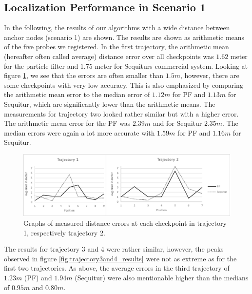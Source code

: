 \subsection{Localization Performance in Scenario 1}
In the following, the results of our algorithms with a wide distance between anchor nodes (scenario 1) are shown. The results are shown as arithmetic means of the five probes we registered. In the first trajectory, the arithmetic mean (hereafter often called average) distance error over all checkpoints was $1.62$ meter for the particle filter and $1.75$ meter for Sequiturs commercial system. Looking at figure \ref{fig:trajectory1and2_results}, we see that the errors are often smaller than $1.5m$, however, there are some checkpoints with very low accuracy. This is also emphasized by comparing the arithmetic mean error to the median error of $1.12m$ for PF and $1.13m$ for Sequitur, which are significantly lower than the arithmetic means. The measurements for trajectory two looked rather similar but with a higher error. The arithmetic mean error for the PF was $2.39m$ and for Sequitur $2.35m$. The median errors were again a lot more accurate with $1.59m$ for PF and $1.16m$ for Sequitur.
\begin{figure}[th]
\centering
\includegraphics[width=1.0\textwidth]{Figures/trajectory1_2_results}
\decoRule
\caption[Localization Results of Trajectory 1 and 2]{Graphs of measured distance errors at each checkpoint in trajectory 1, respectively trajectory 2.}
\label{fig:trajectory1and2_results}
\end{figure}
The results for trajectory 3 and 4 were rather similar, however, the peaks observed in figure \ref{fig:trajectory3and4_results} were not as extreme as for the first two trajectories. As above, the average errors in the third trajectory of $1.23m$ (PF) and $1.94m$ (Sequitur) were also mentionable higher than the medians of $0.95m$ and $0.80m$.
